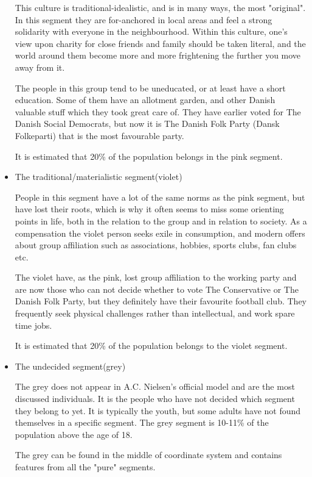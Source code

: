 \begin{itemize}
This culture is traditional-idealistic, and is in many ways, the most "original". In this segment they are for-anchored in local areas and feel a strong solidarity with everyone in the neighbourhood. Within this culture, one's view upon charity for close friends and family should be taken literal, and the world around them become more and more frightening the further you move away from it.

The people in this group tend to be uneducated, or at least have a short education. Some of them have an allotment garden, and other Danish valuable stuff which they took great care of. They have earlier voted for The Danish Social Democrats, but now it is The Danish Folk Party (Dansk Folkeparti) that is the most favourable party.

It is estimated that 20\% of the population belongs in the pink segment.

\item The traditional/materialistic segment(violet)

People in this segment have a lot of the same norms as the pink segment, but have lost their roots, which is why it often seems to miss some orienting points in life, both in the relation to the group and in relation to society. As a compensation the violet person seeks exile in consumption, and modern offers about group affiliation such as associations, hobbies, sports clubs, fan clubs etc. 

The violet have, as the pink, lost group affiliation to the working party and are now those who can not decide whether to vote The Conservative or The Danish Folk Party, but they definitely have their favourite football club. They frequently seek physical challenges rather than intellectual, and work spare time jobs.

It is estimated that 20\% of the population belongs to the violet segment.

\item The undecided segment(grey)

The grey does not appear in A.C. Nielsen's official model and are the most discussed individuals. It is the people who have not decided which segment they belong to yet. It is typically the youth, but some adults have not found themselves in a specific segment. The grey segment is 10-11\% of the population above the age of 18.

The grey can be found in the middle of coordinate system and contains features from all the "pure" segments.
\end{itemize}
\citep{minerva}


